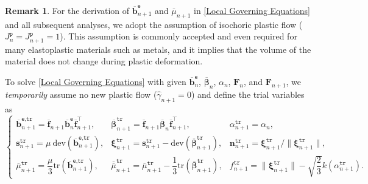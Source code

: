 \documentclass[preprint,11pt]{elsarticle}
\theoremstyle{definition}
\newtheorem{remark}{Remark}
\begin{document}
\begin{remark}
For the derivation of $\overline{\mathbf{b}}_{n+1}^\texttt{e}$ and $\overline{\mu}_{n+1}$ in \eqref{Local Governing Equations} and all subsequent analyses, we adopt the assumption of isochoric plastic flow ($J_n^\texttt{p} = J_{n+1}^\texttt{p} = 1$). This assumption is commonly accepted and even required \citep{weber_finite_1990, simo_algorithms_1992, simo_associative_1992, wang_how_2017} for many elastoplastic materials such as metals, and it implies that the volume of the material does not change during plastic deformation.
\end{remark}

To solve \eqref{Local Governing Equations} with given $\overline{\mathbf{b}}_n^\texttt{e}$, $\overline{\boldsymbol{\beta}}_n$, $\alpha_n$, $\mathbf{F}_n$, and $\mathbf{F}_{n+1}$, we \textit{temporarily} assume no new plastic flow ($\widehat{\gamma}_{n+1}=0$) and define the trial variables as
\begin{equation} \label{Trial Variables}
    \left\{ \begin{array}{llll}
        \overline{\mathbf{b}}_{n+1}^\texttt{e,tr}
        = \overline{\mathbf{f}}_{n+1} \overline{\mathbf{b}}_n^\texttt{e} \overline{\mathbf{f}}_{n+1}^\top,

        & \overline{\boldsymbol{\beta}}_{n+1}^\texttt{tr}
        = \overline{\mathbf{f}}_{n+1} \overline{\boldsymbol{\beta}}_n \overline{\mathbf{f}}_{n+1}^\top,

        & \alpha_{n+1}^\texttt{tr} = \alpha_n, \\[10pt]

        \mathbf{s}_{n+1}^\texttt{tr} = \mu\ \text{dev} \left( \overline{\mathbf{b}}_{n+1}^\texttt{e,tr} \right),

        &\boldsymbol{\xi}_{n+1}^\texttt{tr}
        = \mathbf{s}_{n+1}^\texttt{tr} - \text{dev} \left( \overline{\boldsymbol{\beta}}_{n+1}^\texttt{tr} \right),

        &\mathbf{n}_{n+1}^\texttt{tr} = \boldsymbol{\xi}_{n+1}^\texttt{tr} / \lVert \boldsymbol{\xi}_{n+1}^\texttt{tr} \rVert, \\[10pt]

        \overline{\mu}_{n+1}^\texttt{tr} = \dfrac{\mu}{3} \text{tr}\left( \overline{\mathbf{b}}_{n+1}^\texttt{e,tr} \right),

        & \overline{\overline{\mu}}_{n+1}^\texttt{tr} = \overline{\mu}_{n+1}^\texttt{tr} - \dfrac{1}{3} \text{tr} \left( \overline{\boldsymbol{\beta}}_{n+1}^\texttt{tr} \right),

        & f_{n+1}^\texttt{tr} = \lVert \boldsymbol{\xi}_{n+1}^\texttt{tr} \rVert
        - \sqrt{\dfrac{2}{3}} k \left( \alpha_{n+1}^\texttt{tr} \right).
    \end{array} \right.
\end{equation}
\end{document}

